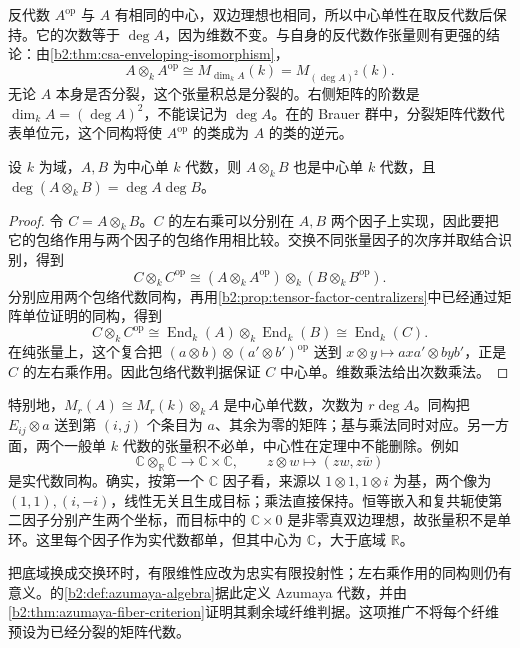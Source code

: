 反代数 \(A^{\mathrm{op}}\) 与 \(A\) 有相同的中心，双边理想也相同，所以中心单性在取反代数后保持。它的次数等于 \(\deg A\)，因为维数不变。与自身的反代数作张量则有更强的结论：由\cref{b2:thm:csa-enveloping-isomorphism}，
\[
	A\otimes_kA^{\mathrm{op}}\cong M_{\dim_kA}(k) =M_{(\deg A)^2}(k).
\]
无论 \(A\) 本身是否分裂，这个张量积总是分裂的。右侧矩阵的阶数是 \(\dim_kA=(\deg A)^2\)，不能误记为 \(\deg A\)。在的 Brauer 群中，分裂矩阵代数代表单位元，这个同构将使 \(A^{\mathrm{op}}\) 的类成为 \(A\) 的类的逆元。

\begin{theorem}[中心单代数的张量积]\label{b2:thm:csa-tensor-product}
	设 \(k\) 为域，\(A,B\) 为中心单 \(k\) 代数，则 \(A\otimes_kB\) 也是中心单 \(k\) 代数，且 \(\deg(A\otimes_kB)=\deg A\deg B\)。
\end{theorem}
\begin{proof}
	令 \(C=A\otimes_kB\)。\(C\) 的左右乘可以分别在 \(A,B\) 两个因子上实现，因此要把它的包络作用与两个因子的包络作用相比较。交换不同张量因子的次序并取结合识别，得到
	\[
		C\otimes_kC^{\mathrm{op}} \cong(A\otimes_kA^{\mathrm{op}})\otimes_k(B\otimes_kB^{\mathrm{op}}).
	\]
	分别应用两个包络代数同构，再用\cref{b2:prop:tensor-factor-centralizers}中已经通过矩阵单位证明的同构，得到
	\[
		C\otimes_kC^{\mathrm{op}} \cong\operatorname{End}_k(A)\otimes_k\operatorname{End}_k(B) \cong\operatorname{End}_k(C).
	\]
	在纯张量上，这个复合把 \((a\otimes b)\otimes(a'\otimes b')^{\mathrm{op}}\) 送到 \(x\otimes y\mapsto axa'\otimes byb'\)，正是 \(C\) 的左右乘作用。因此包络代数判据保证 \(C\) 中心单。维数乘法给出次数乘法。
\end{proof}

特别地，\(M_r(A)\cong M_r(k)\otimes_kA\) 是中心单代数，次数为 \(r\deg A\)。同构把 \(E_{ij}\otimes a\) 送到第 \((i,j)\) 个条目为 \(a\)、其余为零的矩阵；基与乘法同时对应。另一方面，两个一般单 \(k\) 代数的张量积不必单，中心性在定理中不能删除。例如
\[
	\mathbb C\otimes_{\mathbb R}\mathbb C\longrightarrow\mathbb C\times\mathbb C, \qquad z\otimes w\longmapsto(zw,z\bar w)
\]
是实代数同构。确实，按第一个 \(\mathbb C\) 因子看，来源以 \(1\otimes1,1\otimes i\) 为基，两个像为 \((1,1),(i,-i)\)，线性无关且生成目标；乘法直接保持。恒等嵌入和复共轭使第二因子分别产生两个坐标，而目标中的 \(\mathbb C\times0\) 是非零真双边理想，故张量积不是单环。这里每个因子作为实代数都单，但其中心为 \(\mathbb C\)，大于底域 \(\mathbb R\)。

\ProseParagraphBreak
把底域换成交换环时，有限维性应改为忠实有限投射性；左右乘作用的同构则仍有意义。的\cref{b2:def:azumaya-algebra}据此定义 Azumaya 代数，并由\cref{b2:thm:azumaya-fiber-criterion}证明其剩余域纤维判据。这项推广不将每个纤维预设为已经分裂的矩阵代数。

